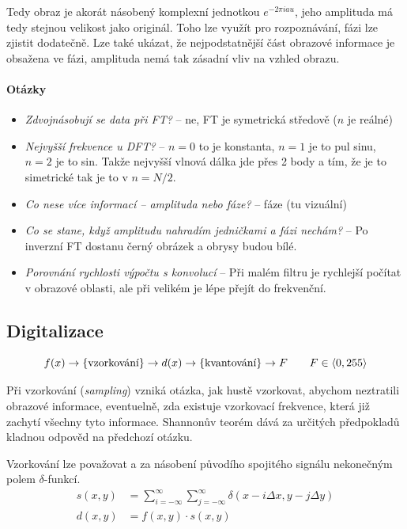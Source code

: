 Tedy obraz je akorát násobený komplexní jednotkou $e^{-2\pi iau}$, jeho amplituda má tedy stejnou velikost jako originál. Toho lze využít pro rozpoznávání, fázi lze zjistit dodatečně. Lze také ukázat, že nejpodstatnější část obrazové informace je obsažena ve fázi, amplituda nemá tak zásadní vliv na vzhled obrazu.


\paragraph{Otázky}
\begin{itemize}
\item \emph{Zdvojnásobují se data při FT?} -- ne, FT je symetrická středově ($ n $ je reálné)
\item \emph{Nejvyšší frekvence u DFT?} -- $ n=0 $ to je konstanta, $ n=1 $ je to pul sinu, $ n=2 $ je to sin. Takže nejvyšší vlnová dálka jde přes 2 body a tím, že je to simetrické tak je to v $ n=N/2 $.
\item \emph{Co nese více informací -- amplituda nebo fáze?} -- fáze (tu vizuální)
\item \emph{Co se stane, když amplitudu nahradím jedničkami a fázi nechám?} -- Po inverzní FT dostanu černý obrázek a obrysy budou bílé.
\item \emph{Porovnání rychlosti výpočtu s konvolucí} -- Při malém filtru je rychlejší počítat v obrazové oblasti, ale při velikém je lépe přejít do frekvenční.
\end{itemize}
\subsection{Digitalizace}
\begin{equation}
f(x)\rightarrow \{\hbox{vzorkování}\}\rightarrow d(x) \rightarrow \{\hbox{kvantování}\} \rightarrow F\qquad F\in\langle0,255\rangle
\end{equation}

Při vzorkování (\emph{sampling}) vzniká otázka, jak hustě vzorkovat, abychom neztratili obrazové informace, eventuelně, zda existuje vzorkovací frekvence, která již zachytí všechny tyto informace. Shannonův teorém dává za určitých předpokladů kladnou odpověd na předchozí otázku. 

Vzorkování lze považovat a za násobení původího spojitého signálu nekonečným polem $\delta$-funkcí.
\begin{align}
s(x,y) &= \sum\limits_{i=-\infty}^\infty\sum\limits_{j=-\infty}^\infty\delta(x-i\Delta x,y-j\Delta y)\\
d(x,y) &= f(x,y)\cdot s(x,y)
\end{align}

